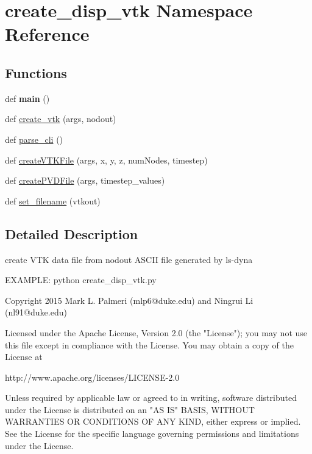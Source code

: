 \hypertarget{namespacecreate__disp__vtk}{}\section{create\+\_\+disp\+\_\+vtk Namespace Reference}
\label{namespacecreate__disp__vtk}
\subsection*{Functions}
\begin{DoxyCompactItemize}
\item 
\hypertarget{namespacecreate__disp__vtk_a72429e670b45f61f53fc309ef87c836a}{}def {\bfseries main} ()\label{namespacecreate__disp__vtk_a72429e670b45f61f53fc309ef87c836a}

\item 
def \hyperlink{namespacecreate__disp__vtk_a8a2e85df552883779116617b84f31de9}{create\+\_\+vtk} (args, nodout)
\item 
def \hyperlink{namespacecreate__disp__vtk_aa29842250cfc59d230c0eb3617c0e900}{parse\+\_\+cli} ()
\item 
def \hyperlink{namespacecreate__disp__vtk_aea2510afb08b11659a0ee122da1d8a1e}{create\+V\+T\+K\+File} (args, x, y, z, num\+Nodes, timestep)
\item 
def \hyperlink{namespacecreate__disp__vtk_acddcd5ee1cd483d966086fd3249f4a6c}{create\+P\+V\+D\+File} (args, timestep\+\_\+values)
\item 
def \hyperlink{namespacecreate__disp__vtk_ab932ee0e10a84dcbcd459ad50b12fe24}{set\+\_\+filename} (vtkout)
\end{DoxyCompactItemize}


\subsection{Detailed Description}
\begin{DoxyVerb}create VTK data file from nodout ASCII file generated by ls-dyna

EXAMPLE: python create_disp_vtk.py

Copyright 2015 Mark L. Palmeri (mlp6@duke.edu) and Ningrui Li (nl91@duke.edu)

Licensed under the Apache License, Version 2.0 (the "License");
you may not use this file except in compliance with the License.
You may obtain a copy of the License at

http://www.apache.org/licenses/LICENSE-2.0

Unless required by applicable law or agreed to in writing, software
distributed under the License is distributed on an "AS IS" BASIS,
WITHOUT WARRANTIES OR CONDITIONS OF ANY KIND, either express or implied.
See the License for the specific language governing permissions and
limitations under the License.
\end{DoxyVerb}
 

